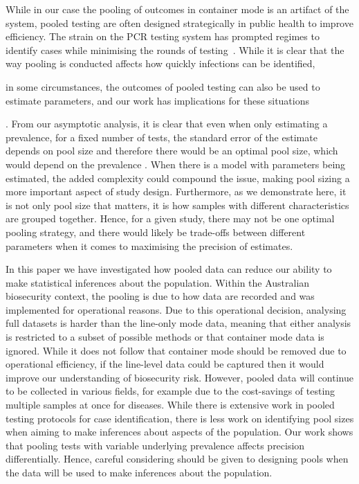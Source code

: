 \documentclass[useAMS,usenatbib,referee]{biom}
\newif\ifproofread
\newcommand{\rev}[1]{%
\ifproofread
\hl{#1}%
\else
#1%
\fi
}
\begin{document}
While in our case the pooling of outcomes in container mode is an artifact of the system, pooled testing are often designed strategically in public health to improve efficiency. The strain on the PCR testing system has prompted regimes to identify cases while minimising the rounds of testing~\citep{mutesa_pooled_2021}. While it is clear that the way pooling is conducted affects how quickly infections can be identified, \rev{in some circumstances, the outcomes of pooled testing can also be used to estimate parameters, and our work has implications for these situations} \citep{delaigle_nonparametric_2015, chatterjee_regression_2020, mcmahan_bayesian_2017, liu_generalized_2020}. From our asymptotic analysis, it is clear that even when only estimating a prevalence, for a fixed number of tests, the standard error of the estimate depends on pool size and therefore there would be an optimal pool size, which would depend on the prevalence  \citep{keeling2022modeling}. When there is a model with parameters being estimated, the added complexity could compound the issue, making pool sizing a more important aspect of study design. Furthermore, as we demonstrate here, it is not only pool size that matters, it is how samples with different characteristics are grouped together. Hence, for a given study, there may not be one optimal pooling strategy, and there would likely be trade-offs between different parameters when it comes to maximising the precision of estimates. 

\rev{In this paper we have investigated how pooled data can reduce our ability to make statistical inferences about the population. Within the Australian biosecurity context, the pooling is due to how data are recorded and was implemented for operational reasons. Due to this operational decision, analysing full datasets is harder than the line-only mode data, meaning that either analysis is restricted to a subset of possible methods or that container mode data is ignored. While it does not follow that container mode should be removed due to operational efficiency, if the line-level data could be captured then it would improve our understanding of biosecurity risk. 
However, pooled data will continue to be collected in various fields, for example due to the cost-savings of testing multiple samples at once for diseases.
While there is extensive work in pooled testing protocols for case identification, there is less work on identifying pool sizes when aiming to make inferences about aspects of the population.
Our work shows that pooling tests with variable underlying prevalence affects precision differentially. Hence, careful considering should be given to designing pools when the data will be used to make inferences about the population.}
\end{document}
